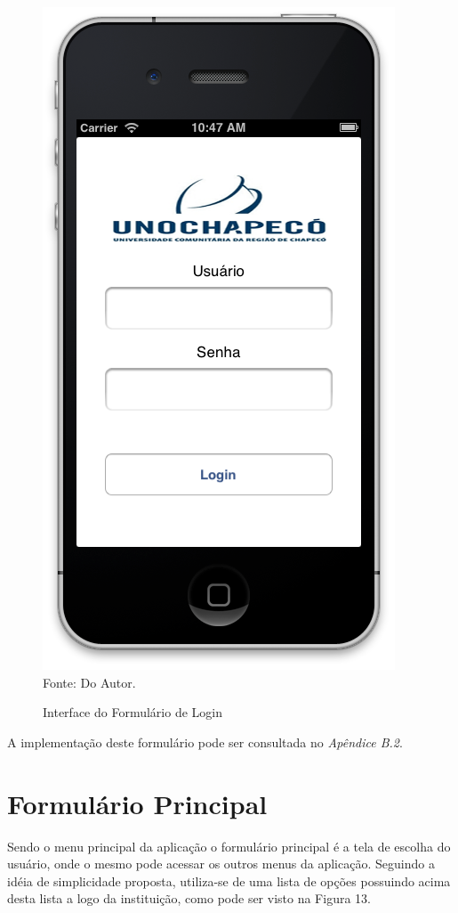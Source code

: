 \begin{figure}[!htb]
     \centering
     \caption[Formulário de Login - Interface]{Interface do Formulário de Login}
     \includegraphics[scale=0.34]{imagens/formlogin.png}
     \\  Fonte: Do Autor.
\end{figure}

A implementação deste formulário pode ser consultada no \emph{Apêndice B.2}.

\section{Formulário Principal}
Sendo o menu principal da aplicação o formulário principal é a tela de escolha do usuário, onde o mesmo pode acessar os outros menus da aplicação. Seguindo a idéia de simplicidade proposta, utiliza-se de uma lista de opções possuindo acima desta lista a logo da instituição, como pode ser visto na Figura 13.

